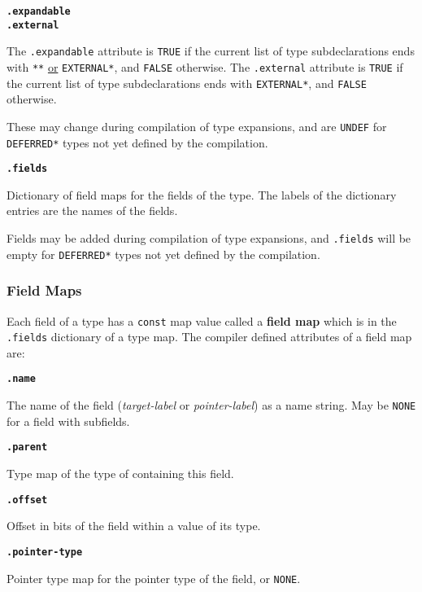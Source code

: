 \documentclass[12pt]{article}
\newcommand{\key}[1]{{\rm \bfseries #1}}
\newcommand{\ttkey}[1]{{\tt \bfseries #1}}
\newenvironment{indpar}[1][0.3in]%
	{\begin{list}{}%
		     {\setlength{\itemsep}{0in}%
		      \setlength{\topsep}{0in}%
		      \setlength{\parsep}{1ex}%
		      \setlength{\labelwidth}{#1}%
		      \setlength{\leftmargin}{#1}%
		      \addtolength{\leftmargin}{\labelsep}}%
	 \item}%
	{\end{list}}
\begin{document}
\ttkey{.expandable} \\
\ttkey{.external}
\begin{indpar}
The {\tt .expandable} attribute is {\tt TRUE} if the
current list of type subdeclarations ends with
{\tt ***} \underline{or} {\tt *EXTERNAL*},
and {\tt FALSE} otherwise.
The {\tt .external} attribute is {\tt TRUE} if the current
list of type subdeclarations ends with
{\tt *EXTERNAL*}, and {\tt FALSE} otherwise.

These may change during compilation of type expansions, and are
{\tt UNDEF} for {\tt *DEFER\-RED*} types not yet defined by the
compilation.
\end{indpar}

\ttkey{.fields}
\begin{indpar}
Dictionary of field maps for the fields of the type.  The labels
of the dictionary entries are the names of the fields.

Fields may be added during compilation of type expansions, and {\tt .fields}
will be empty for {\tt *DEFERRED*} types not yet defined by the
compilation.
\end{indpar}

\subsubsection{Field Maps}
\label{FIELD-MAPS}

Each field of a type has a {\tt const} map value called
a \key{field map} which is in the {\tt .fields} dictionary of
a type map.  The compiler defined attributes of a field map are:

\ttkey{.name}
\begin{indpar}
The name of the field ({\em target-label} or {\em pointer-label})
as a name string.  May be {\tt NONE} for a field with subfields.
\end{indpar}

\ttkey{.parent}
\begin{indpar}
Type map of the type of containing this field.
\end{indpar}

\ttkey{.offset}
\begin{indpar}
Offset in bits of the field within a value of its type.
\end{indpar}

\ttkey{.pointer-type}
\begin{indpar}
Pointer type map for the pointer type of the field,
or {\tt NONE}.
\end{indpar}
\end{document}
